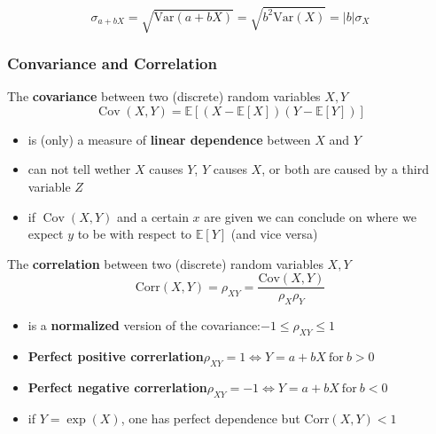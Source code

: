 \noindent\begin{equation*}
    \sigma_{a+bX}=\sqrt{\mathrm{Var}(a+bX)}=\sqrt{b^2\mathrm{Var}(X)}=|b|\sigma_X
\end{equation*}

\subsubsection{Convariance and Correlation}
The \textbf{covariance} between two (discrete) random variables $X,Y$
\noindent\begin{equation*}
    \operatorname{Cov}(X,Y)=\mathbb{E}[(X-\mathbb{E}[X])(Y-\mathbb{E}[Y])]
\end{equation*}
\begin{itemize}
    \item is (only) a measure of \textbf{linear dependence} between $X$ and $Y$
    \item can not tell wether $X$ causes $Y$, $Y$ causes $X$, or both are caused by a third variable $Z$
    \item if $\operatorname{Cov}(X,Y)$ and a certain $x$ are given we can conclude on where we expect $y$ to be with respect to $\mathbb{E}[Y]$ (and vice versa)
\end{itemize}

\newpar{}
The \textbf{correlation} between two (discrete) random variables $X,Y$
\noindent\begin{equation*}
    \mathrm{Corr}(X,Y)=\rho_{XY}=\frac{\mathrm{Cov}(X,Y)}{\rho_{X}\rho_{Y}}
\end{equation*}
\begin{itemize}
    \item is a \textbf{normalized} version of the covariance:\newline$-1 \leq \rho_{XY} \leq 1$
    \item \textbf{Perfect positive correrlation}\newline $\rho_{XY}=1\Leftrightarrow Y=a+bX\mathrm{~for~}b>0$
    \item \textbf{Perfect negative correrlation}\newline $\rho_{XY}=-1\Leftrightarrow Y=a+bX\mathrm{~for~}b<0$
    \item if $Y=\exp(X)$, one has perfect dependence but $\mathrm{Corr}(X,Y)<1$
\end{itemize}

